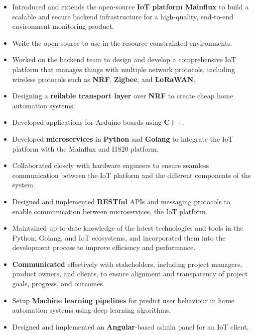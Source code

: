 \vspace{1cm}

\vspace{0.5cm}
\begin{itemize}
  \item Introduced and extends the open-source \textbf{IoT platform Mainflux} to build a scalable and secure backend
    infrastructure for a high-quality, end-to-end environment monitoring product.
  \item Write the open-source  to use in the resource constrainted environments.
  \item Worked on the backend team to design and develop a comprehensive IoT platform that manages things with multiple network protocols,
    including wireless protocols such as \textbf{NRF}, \textbf{Zigbee}, and \textbf{LoRaWAN}.
  \item Designing a \textbf{reilable transport layer} over \textbf{NRF} to create cheap home automation systems.
  \item Developed applications for Arduino boards using \textbf{C++}.
  \item Developed \textbf{microservices} in \textbf{Python} and \textbf{Golang} to integrate the IoT platform with the Mainflux and I1820 platform.
  \item Collaborated closely with hardware engineers to ensure seamless communication between the IoT
    platform and the different components of the system.
  \item Designed and implemented \textbf{RESTful} APIs and messaging protocols to
    enable communication between microservices, the IoT platform.
  \item Maintained up-to-date knowledge of the latest technologies and tools in the Python,
    Golang, and IoT ecosystems, and incorporated them into the development process to improve efficiency and performance.
  \item \textbf{Communicated} effectively with stakeholders, including project managers, product owners, and clients,
    to ensure alignment and transparency of project goals, progress, and outcomes.
  \item Setup \textbf{Machine learning pipelines} for predict user behaviour in home automation systems using deep learning algorithms.
  \item Designed and implemented an \textbf{Angular}-based admin panel for an IoT client,

\end{itemize}
